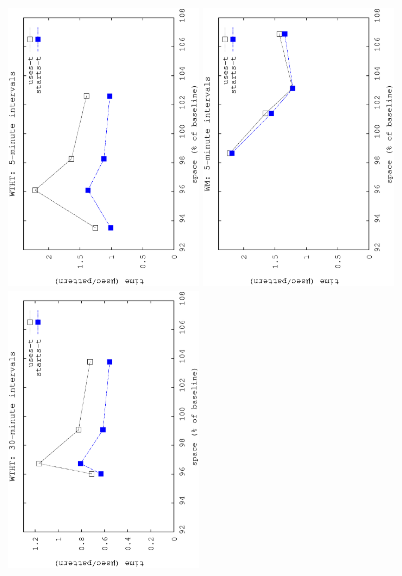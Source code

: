 \begin{figure}[!ht]
	\begin{center}
			{\includegraphics[angle=-90,width=0.45\textwidth]{figures_synt/porto_t5mht.eps}}
			{\includegraphics[angle=-90,width=0.45\textwidth]{figures_synt/porto_t5mwm.eps}}
			{\includegraphics[angle=-90,width=0.45\textwidth]{figures_synt/porto_t30mht.eps}}

\end{center}
\end{figure}

